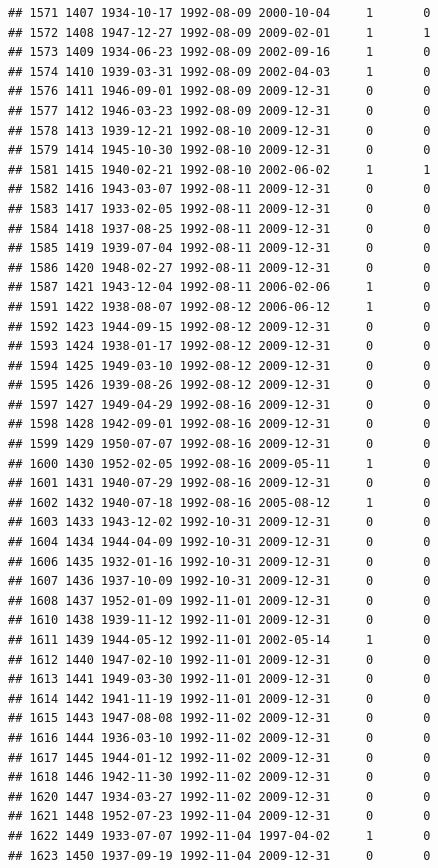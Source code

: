 \documentclass[
]{book}
\theoremstyle{definition}
\theoremstyle{definition}
\theoremstyle{definition}
\theoremstyle{definition}
\theoremstyle{remark}
\begin{document}
\begin{verbatim}
## 1571 1407 1934-10-17 1992-08-09 2000-10-04     1       0
## 1572 1408 1947-12-27 1992-08-09 2009-02-01     1       1
## 1573 1409 1934-06-23 1992-08-09 2002-09-16     1       0
## 1574 1410 1939-03-31 1992-08-09 2002-04-03     1       0
## 1576 1411 1946-09-01 1992-08-09 2009-12-31     0       0
## 1577 1412 1946-03-23 1992-08-09 2009-12-31     0       0
## 1578 1413 1939-12-21 1992-08-10 2009-12-31     0       0
## 1579 1414 1945-10-30 1992-08-10 2009-12-31     0       0
## 1581 1415 1940-02-21 1992-08-10 2002-06-02     1       1
## 1582 1416 1943-03-07 1992-08-11 2009-12-31     0       0
## 1583 1417 1933-02-05 1992-08-11 2009-12-31     0       0
## 1584 1418 1937-08-25 1992-08-11 2009-12-31     0       0
## 1585 1419 1939-07-04 1992-08-11 2009-12-31     0       0
## 1586 1420 1948-02-27 1992-08-11 2009-12-31     0       0
## 1587 1421 1943-12-04 1992-08-11 2006-02-06     1       0
## 1591 1422 1938-08-07 1992-08-12 2006-06-12     1       0
## 1592 1423 1944-09-15 1992-08-12 2009-12-31     0       0
## 1593 1424 1938-01-17 1992-08-12 2009-12-31     0       0
## 1594 1425 1949-03-10 1992-08-12 2009-12-31     0       0
## 1595 1426 1939-08-26 1992-08-12 2009-12-31     0       0
## 1597 1427 1949-04-29 1992-08-16 2009-12-31     0       0
## 1598 1428 1942-09-01 1992-08-16 2009-12-31     0       0
## 1599 1429 1950-07-07 1992-08-16 2009-12-31     0       0
## 1600 1430 1952-02-05 1992-08-16 2009-05-11     1       0
## 1601 1431 1940-07-29 1992-08-16 2009-12-31     0       0
## 1602 1432 1940-07-18 1992-08-16 2005-08-12     1       0
## 1603 1433 1943-12-02 1992-10-31 2009-12-31     0       0
## 1604 1434 1944-04-09 1992-10-31 2009-12-31     0       0
## 1606 1435 1932-01-16 1992-10-31 2009-12-31     0       0
## 1607 1436 1937-10-09 1992-10-31 2009-12-31     0       0
## 1608 1437 1952-01-09 1992-11-01 2009-12-31     0       0
## 1610 1438 1939-11-12 1992-11-01 2009-12-31     0       0
## 1611 1439 1944-05-12 1992-11-01 2002-05-14     1       0
## 1612 1440 1947-02-10 1992-11-01 2009-12-31     0       0
## 1613 1441 1949-03-30 1992-11-01 2009-12-31     0       0
## 1614 1442 1941-11-19 1992-11-01 2009-12-31     0       0
## 1615 1443 1947-08-08 1992-11-02 2009-12-31     0       0
## 1616 1444 1936-03-10 1992-11-02 2009-12-31     0       0
## 1617 1445 1944-01-12 1992-11-02 2009-12-31     0       0
## 1618 1446 1942-11-30 1992-11-02 2009-12-31     0       0
## 1620 1447 1934-03-27 1992-11-02 2009-12-31     0       0
## 1621 1448 1952-07-23 1992-11-04 2009-12-31     0       0
## 1622 1449 1933-07-07 1992-11-04 1997-04-02     1       0
## 1623 1450 1937-09-19 1992-11-04 2009-12-31     0       0

\end{verbatim}
\end{document}
